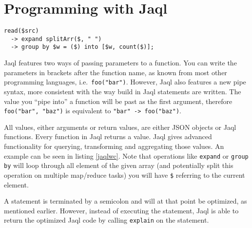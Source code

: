 \section{Programming with Jaql} 

\begin{lstlisting}[language=jaql,caption=Wordcount in Jaql,float,label=jaqlwc]
read($src)
  -> expand splitArr($, " ")
  -> group by $w = ($) into [$w, count($)];
\end{lstlisting}

Jaql features two ways of passing parameters to a function. You can write the parameters
in brackets after the function name, as known from most other programming languages, i.e.\
\lstinline[language=jaql]!foo("bar")!. However, Jaql also features a new pipe syntax, more
consistent with the way build in Jaql statements are written. The value you ``pipe into''
a function will be past as the first argument, therefore \lstinline[language=jaql]!foo("bar", "baz")!
is equivalent to \lstinline[language=jaql]!"bar" -> foo("baz")!.

All values, either arguments or return values, are either JSON objects or Jaql functions.
Every function in Jaql returns a value. Jaql gives advanced functionality for querying, transforming
and aggregating those values. An example can be seen in listing \ref{jaqlwc}. Note that
operations like {\tt expand} or {\tt group by} will loop through all element of the given array
(and potentially split this operation on multiple map/reduce tasks) you will have {\tt\$} referring
to the current element.

A statement is terminated by a semicolon and will at that point be optimized, as mentioned earlier.
However, instead of executing the statement, Jaql is able to return the optimized Jaql code by calling
{\tt explain} on the statement.